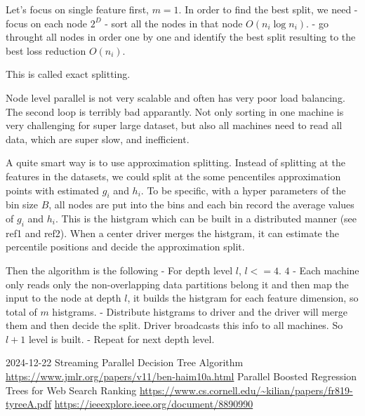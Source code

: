 
Let's focus on single feature first, $m=1$. In order to find the best split, we
need
- focus on each node $2^D$
- sort all the nodes in that node $O(n_i\log n_i)$.
- go throught all nodes in order one by one and identify the best split
  resulting to the best loss reduction $O(n_i)$.

This is called exact splitting.

Node level parallel is not very scalable and often has very poor load balancing.
The second loop is terribly bad apparantly. Not only sorting in one machine is
very challenging for super large dataset, but also all machines need to read all
data, which are super slow, and inefficient.

A quite smart way is to use approximation splitting. Instead of splitting at the
features in the datasets, we could split at the some pencentiles approximation
points with estimated $g_i$ and $h_i$. To be specific, with a hyper parameters
of the bin size $B$, all nodes are put into the bins and each bin record the
average values of $g_i$ and $h_i$. This is the histgram which can be built in a
distributed manner (see ref1 and ref2). When a center driver merges the
histgram, it can estimate the percentile positions and decide the approximation
split.

Then the algorithm is the following
- For depth level $l$, $l<=4$. $4$
- Each machine only reads only the non-overlapping data partitions belong it and then
  map the input to the node at depth $l$, it builds the histgram for each
  feature dimension, so total of $m$ histgrams.
- Distribute histgrams to driver and the driver will merge them and then decide
  the split. Driver broadcasts this info to all machines. So $l+1$ level is built.
- Repeat for next depth level.

2024-12-22 Streaming Parallel Decision Tree Algorithm \url{https://www.jmlr.org/papers/v11/ben-haim10a.html}
Parallel Boosted Regression Trees for Web Search Ranking \url{https://www.cs.cornell.edu/~kilian/papers/fr819-tyreeA.pdf}
\url{https://ieeexplore.ieee.org/document/8890990}

\vfill
\bye

